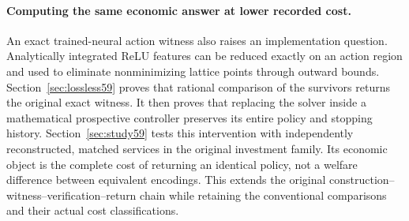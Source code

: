 \paragraph{Computing the same economic answer at lower recorded cost.}
An exact trained-neural action witness also raises an implementation question. Analytically integrated ReLU features can be reduced exactly on an action region and used to eliminate nonminimizing lattice points through outward bounds. Section~\ref{sec:lossless59} proves that rational comparison of the survivors returns the original exact witness. It then proves that replacing the solver inside a mathematical prospective controller preserves its entire policy and stopping history. Section~\ref{sec:study59} tests this intervention with independently reconstructed, matched services in the original investment family. Its economic object is the complete cost of returning an identical policy, not a welfare difference between equivalent encodings. This extends the original construction--witness--verification--return chain while retaining the conventional comparisons and their actual cost classifications.
